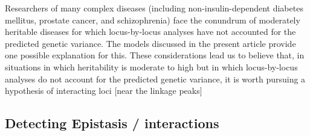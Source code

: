 Researchers of many complex diseases (including non-insulin-dependent diabetes mellitus, prostate cancer, and schizophrenia) face the conundrum of moderately heritable diseases for which locus-by-locus analyses have not accounted for the predicted genetic variance. The models discussed in the present article provide one possible explanation for this. \cite{culverhouse2002perspective}
These considerations lead us to believe that, in situations in which heritability is moderate to high but in which locus-by-locus analyses do not account for the predicted genetic variance, it is worth pursuing a hypothesis of interacting loci [near the linkage peaks] \cite{culverhouse2002perspective}

\subsection{Detecting Epistasis / interactions}


